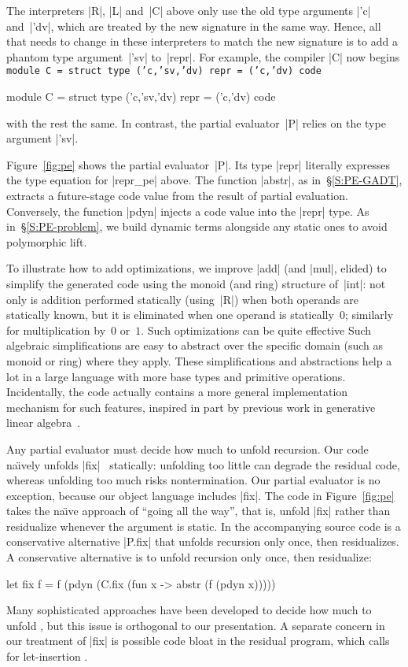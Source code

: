 The interpreters |R|, |L| and~|C| above only use the old
type arguments |'c| and~|'dv|, which are treated by the new signature
in the same way.  Hence, all that needs to change in these interpreters
to match the new signature is to add a phantom type
argument~|'sv| to~|repr|.
For example, the compiler |C| now begins
\ifshort
\texttt{module C = struct
  type ('c,'sv,'dv) repr = ('c,'dv) code}
\else
\begin{code}
module C = struct
  type ('c,'sv,'dv) repr = ('c,'dv) code
\end{code}
\fi
with the rest the same.
In contrast, the partial evaluator~|P| relies on the type argument |'sv|.


Figure~\ref{fig:pe} shows the partial evaluator~|P|.
Its type |repr| literally expresses the type equation for |repr_pe| above.
The function |abstr|, as in~\S\ref{S:PE-GADT},
extracts a future-stage code value from the result of
partial evaluation.  Conversely, the function |pdyn| injects a
code value into the |repr| type. As
in~\S\ref{S:PE-problem}, we build dynamic terms alongside
any static ones to avoid polymorphic lift.

To illustrate how to add optimizations, we improve |add| (and |mul|,
elided) to simplify the generated code using the monoid (and ring)
structure of~|int|: not only is addition performed statically
(using~|R|) when both operands are statically known, but it is
eliminated when one operand is statically~$0$; similarly for
multiplication by~$0$ or~$1$.  
\ifshort
Such optimizations can be quite effective
\else
Such algebraic simplifications are easy
to abstract over the specific domain (such as monoid or ring) where they
apply.  These simplifications and abstractions help a lot
\fi
in a large language with more base types and primitive operations.
\ifshort\else
Incidentally, the code actually contains a more general implementation
mechanism for such features, inspired in part by previous work in
generative linear algebra~\citep{CaretteKiselyov05}.
\fi

Any partial evaluator must decide how much to unfold recursion\ifshort.
Our code na\"\i vely unfolds |fix|
\else\
statically: unfolding too little can degrade the residual code, whereas
unfolding too much risks nontermination.  Our partial evaluator is no
exception, because our object language includes |fix|.  The code in
Figure~\ref{fig:pe} takes the na\"\i ve approach of ``going all the
way'', that is, unfold |fix| rather than residualize
\fi
whenever the argument is static.
\ifshort
In the accompanying source code is a conservative
alternative |P.fix| that unfolds recursion only once, then residualizes.
\else
A conservative alternative is to unfold recursion only once, then residualize:
\begin{code}
let fix f = f (pdyn (C.fix (fun x -> abstr (f (pdyn x)))))
\end{code}
\fi
Many sophisticated approaches have been developed to decide how much to unfold
\citep{jones-partial}, but this issue is orthogonal to our presentation.
\ifshort\else
A separate concern in our treatment of |fix| is possible code bloat in
the residual program, which calls for let-insertion
\citep{SwadiTahaKiselyovPasalic2006}.
\fi


